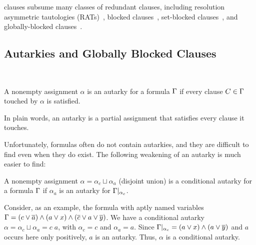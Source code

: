 


\pr clauses subsume many classes of redundant clauses, including resolution
asymmetric tautologies (RATs)~\cite{rat}, blocked clauses~\cite{blockedclause},
set-blocked clauses~\cite{setblocked}, and globally-blocked
clauses~\cite{conditionalautarkies}.

\subsection{Autarkies and Globally Blocked Clauses}~\label{subsec:autarkies}


\begin{definition}[Autarky]
    A nonempty assignment $\alpha$ is an autarky for a formula $\Gamma$ if
    every clause $C \in \Gamma$ touched by $\alpha$ is satisfied.
\end{definition}


In plain words, an autarky is a partial assignment that satisfies every clause it
touches.

Unfortunately, formulas often do not contain autarkies, and they are difficult
to find even when they do exist. The following weakening of an autarky is much
easier to find: 

\begin{definition}
    A nonempty assignment $\alpha = \alpha_c \sqcup \alpha_a$ (disjoint union)
    is a conditional autarky for a formula $\Gamma$ if $\alpha_a$ is an
    autarky for $\Gamma|_{\alpha_c}$.
\end{definition}

Consider, as an example, the formula with aptly named variables $\Gamma = (c
\lor \overline{a}) \land (a \lor x) \land (\overline{c} \lor a \lor
\overline{y})$. We have a conditional autarky $\alpha = \alpha_c \sqcup \alpha_a
= c\;a$, with $\alpha_c = c$ and $\alpha_a = a$. Since $\Gamma|_{\alpha_c} =
(a \lor x) \land (a \lor \overline{y})$ and $a$ occurs here only positively, $a$
is an autarky. Thus, $\alpha$ is a conditional autarky.

